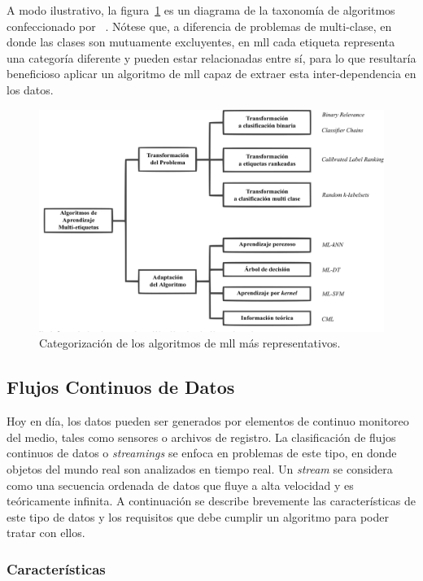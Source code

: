 A modo ilustrativo, la figura~\ref{fig:algorithm_taxonomy} es un diagrama de la
taxonomía de algoritmos confeccionado por
\citeauthor{zhang_review_2014}~\cite{zhang_review_2014}. Nótese que, a
diferencia de problemas de multi-clase, en donde las clases son mutuamente
excluyentes, en \acrshort{mll} cada etiqueta representa una categoría diferente
y pueden estar relacionadas entre sí, para lo que resultaría beneficioso aplicar
un algoritmo de \acrshort{mll} capaz de extraer esta inter-dependencia en los
datos.

\begin{figure}
	\includegraphics[width=\linewidth]{figures/algorithm_taxonomy.png}
	\caption{Categorización de los algoritmos de \acrshort{mll} más representativos.}
	\label{fig:algorithm_taxonomy}
\end{figure}

\subsection{Flujos Continuos de Datos}
\label{intro_streams}

Hoy en día, los datos pueden ser generados por elementos de continuo monitoreo
del medio, tales como sensores o archivos de registro.  La clasificación de
flujos continuos de datos o \textit{streamings} se enfoca en problemas de este
tipo, en donde objetos del mundo real son analizados en tiempo real. Un
\textit{stream} se considera como una secuencia ordenada de datos que fluye a
alta velocidad y es teóricamente infinita. A continuación se describe brevemente
las características de este tipo de datos y los requisitos que debe cumplir un
algoritmo para poder tratar con ellos.

\subsubsection{Características}
\label{stream_caracteristicas}

